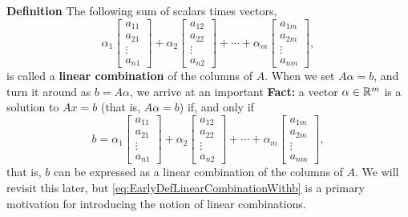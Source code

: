 \documentclass[letterpaper]{book}
\begin{document}
\begin{tcolorbox}[sharp corners, colback=green!30, colframe=green!80!blue,title=\textbf{Linear Combination of the Columns of A}]
\textbf{Definition} The following sum of scalars times vectors,
\begin{equation}
    \label{eq:EarlyDefLinearCombination}
    \alpha_1 \begin{bmatrix} a_{11} \\ a_{21}\\ \vdots \\ a_{n1} \end{bmatrix}  + \alpha_2  \begin{bmatrix} a_{12} \\ a_{22}\\ \vdots \\ a_{n2} \end{bmatrix}  + \cdots + \alpha_m \begin{bmatrix} a_{1m} \\ a_{2m}\\ \vdots \\ a_{nm} \end{bmatrix},
\end{equation}
is called a \textbf{linear combination} of the columns of $A$. When we set $A\alpha = b$, and turn it around as $b =A \alpha$, we arrive at an important \textbf{Fact:} a vector $\alpha \in \mathbb R^m$ is a solution to $Ax=b$ (that is, $A \alpha = b$) if, and only if
\begin{equation}
    \label{eq:EarlyDefLinearCombinationWithb}
   b= \alpha_1 \begin{bmatrix} a_{11} \\ a_{21}\\ \vdots \\ a_{n1} \end{bmatrix}  + \alpha_2  \begin{bmatrix} a_{12} \\ a_{22}\\ \vdots \\ a_{n2} \end{bmatrix}  + \cdots + \alpha_m \begin{bmatrix} a_{1m} \\ a_{2m}\\ \vdots \\ a_{nm} \end{bmatrix},
\end{equation}
that is, $b$ can be expressed as a linear combination of the columns of $A$.
We will revisit this later, but \eqref{eq:EarlyDefLinearCombinationWithb} is a primary motivation for introducing the notion of linear combinations.
\end{tcolorbox}
\end{document}
